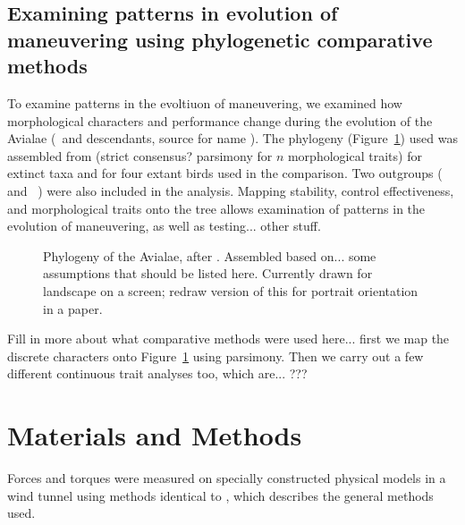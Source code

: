 \subsection{Examining patterns in evolution of maneuvering using phylogenetic comparative methods} 
To examine patterns in the evoltiuon of maneuvering, we examined how morphological characters and performance change during the evolution of the Avialae (\Archaeopteryx\ and descendants, source for name \cite{someone}).  The phylogeny (Figure~\ref{fig:phylogeny}) used was assembled from \cite{Zhou:2010, Li:2010, OConnor:2011} (strict consensus? parsimony for $n$ morphological traits) for extinct taxa and \cite{Cracraft:2004} for four extant birds used in the comparison. Two outgroups (\Anchiornis\ \cite{Hu:2009} and \Microraptor\ \cite{Xu:2003}) were also included in the analysis.  Mapping stability, control effectiveness, and morphological traits onto the tree allows examination of patterns in the evolution of maneuvering, as well as testing... other stuff. 
\begin{figure}[!ht]
\begin{center}
\end{center}
\caption{{ Phylogeny of the Avialae, after \cite{Zhou:2010, Li:2010, OConnor:2011, Cracraft:2004}.}  Assembled based on... some assumptions that should be listed here.  Currently drawn for landscape on a screen; redraw version of this for portrait orientation in a paper.}
\label{fig:phylogeny}
\end{figure}

Fill in more about what comparative methods were used here... first we map the discrete characters onto Figure~\ref{fig:phylogeny} using parsimony.  Then we carry out a few different continuous trait analyses too, which are... ??? 





\section{Materials and Methods}
\label{sec:methods}
Forces and torques were measured on specially constructed physical models in a wind tunnel using methods identical to \cite{plos:part1}, which describes the general methods used.  

